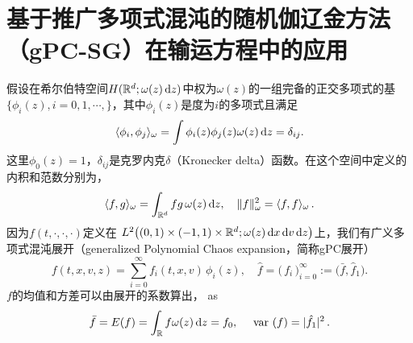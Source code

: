 




\section{基于推广多项式混沌的随机伽辽金方法（gPC-SG）在输运方程中的应用}\label{sec:gPC}

假设在希尔伯特空间$H(\mathbb R^d; \omega(z)\mathop{}\!\mathrm{d} z)$中权为$\omega(z)$的一组完备的正交多项式的基$\{\phi_i(z), i=0,1, \cdots,\}$，其中$\phi_i(z)$是度为$i$的多项式且满足
$$
   \langle \phi_i, \phi_j \rangle_\omega=\int \phi_i(z)\phi_j(z)\omega(z)\mathop{}\!\mathrm{d} z=\delta_{ij}.
$$
这里$\phi_0(z)=1$，$\delta_{i j}$是克罗内克$\delta$（Kronecker delta）函数。在这个空间中定义的内积和范数分别为，
\begin{equation}\label{inner-norm}
  \langle f, g \rangle_\omega= \int_{{\mathbb{R}}^d} fg\,\omega(z)\mathop{}\!\mathrm{d} z,\quad \| f \|_{\omega}^2 = \langle f, f \rangle_{\omega}\,.
\end{equation}
因为$f(t,\cdot,\cdot,\cdot)$定义在
 $L^2\big( (0,1)\times (-1,1)\times \mathbb R^d; \omega(z)\mathop{}\!\mathrm{d} x\mathop{}\!\mathrm{d} v\mathop{}\!\mathrm{d} z\big)$上，我们有广义多项式混沌展开（generalized Polynomial Chaos expansion，简称gPC展开）
$$
   f(t,x,v,z) = \sum_{i=0}^{\infty} f_i(t,x,v) \, \phi_i(z),  \quad
   \hat f = \big(\, f_i\, \big)_{i=0}^\infty:=\big(\bar f, \hat f_1\big).
$$
$f$的均值和方差可以由展开的系数算出，
as
$$
  \bar f= E (f) = \int_{\mathbb R}  f   \omega(z)\mathop{}\!\mathrm{d} z = f_0, \quad \mbox{ var }(f) = |\hat f_1|^2\,.
$$

